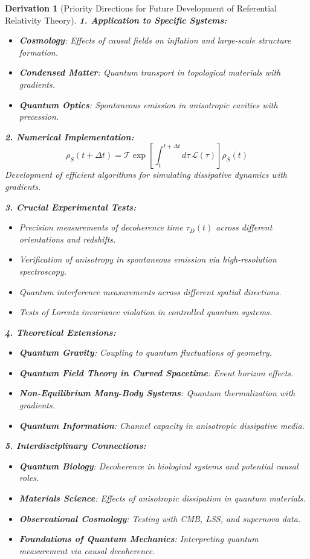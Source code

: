 \documentclass[10pt, a4paper]{article}
\newtheorem{derivation}{Derivation}
\begin{document}
\begin{derivation}[Priority Directions for Future Development of Referential Relativity Theory]
\textbf{1. Application to Specific Systems:}
\begin{itemize}
\item \textbf{Cosmology}: Effects of causal fields on inflation and large-scale structure formation.
\item \textbf{Condensed Matter}: Quantum transport in topological materials with gradients.
\item \textbf{Quantum Optics}: Spontaneous emission in anisotropic cavities with precession.
\end{itemize}

\textbf{2. Numerical Implementation:}
\begin{equation}
\rho_S(t+\Delta t) = \mathcal{T} \exp\left[ \int_t^{t+\Delta t} d\tau \, \mathcal{L}(\tau) \right] \rho_S(t)
\tag{44.1}
\end{equation}
Development of efficient algorithms for simulating dissipative dynamics with gradients.

\textbf{3. Crucial Experimental Tests:}
\begin{itemize}
\item Precision measurements of decoherence time $\tau_D(t)$ across different orientations and redshifts.
\item Verification of anisotropy in spontaneous emission via high-resolution spectroscopy.
\item Quantum interference measurements across different spatial directions.
\item Tests of Lorentz invariance violation in controlled quantum systems.
\end{itemize}

\textbf{4. Theoretical Extensions:}
\begin{itemize}
\item \textbf{Quantum Gravity}: Coupling to quantum fluctuations of geometry.
\item \textbf{Quantum Field Theory in Curved Spacetime}: Event horizon effects.
\item \textbf{Non-Equilibrium Many-Body Systems}: Quantum thermalization with gradients.
\item \textbf{Quantum Information}: Channel capacity in anisotropic dissipative media.
\end{itemize}

\textbf{5. Interdisciplinary Connections:}
\begin{itemize}
\item \textbf{Quantum Biology}: Decoherence in biological systems and potential causal roles.
\item \textbf{Materials Science}: Effects of anisotropic dissipation in quantum materials.
\item \textbf{Observational Cosmology}: Testing with CMB, LSS, and supernova data.
\item \textbf{Foundations of Quantum Mechanics}: Interpreting quantum measurement via causal decoherence.
\end{itemize}


\end{derivation}
\end{document}
